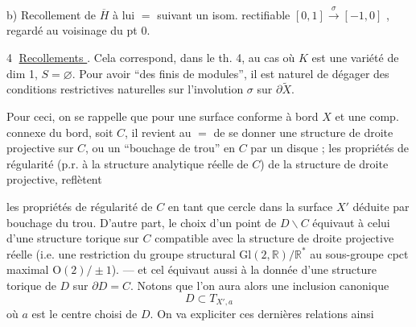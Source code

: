 
b) Recollement de $\overline H$ à lui $=$ suivant un isom. rectifiable $[0,1]\overset{\sigma}{\longrightarrow}[-1,0]$ , regardé au voisinage du pt 0.


\textcircled{4} \uline{Recollements  }.  Cela correspond, dans le th. 4, au cas où $K$ est une variété  de dim 1, $S=\varnothing$.  Pour avoir ``des  finis de modules'', il est naturel de dégager des conditions restrictives naturelles sur l'involution $\sigma$  sur $\partial\widetilde X$.

Pour ceci,  on se rappelle que pour une surface conforme à bord $X$  et une comp. connexe du bord, soit $C$, il revient au $=$ de se donner une structure de droite projective  sur $C$, ou un ``bouchage de trou'' en $C$ par un disque  ; les propriétés de régularité (p.r. à la structure analytique réelle de $C$) de la structure de droite projective, reflètent


les propriétés de régularité de $C$ en tant que cercle  dans la surface   $X'$ déduite par bouchage du trou. D'autre part, le choix d'un point de $D\smallsetminus C$ équivaut à celui d'une structure torique sur $C$ compatible avec la structure de droite projective réelle (i.e. une restriction du groupe structural  $\mathrm{Gl}(2,\mathbb R)/\mathbb R^{*}$ au sous-groupe cpct maximal $\mathrm O(2)/\pm1$).
--- et cel équivaut aussi à la donnée d'une structure torique de $D$ sur  $\partial D=C$. Notons que l'on aura alors une inclusion canonique
\[
D\subset T_{X',a}
\]
où $a$ est le centre choisi de $D$. On va expliciter  ces dernières relations ainsi

